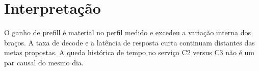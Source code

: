 \section{Interpretação}
O ganho de prefill é material no perfil medido e excedeu a variação interna dos braços. A taxa de decode e a latência de resposta curta continuam distantes das metas propostas. A queda histórica de tempo no serviço C2 versus C3 não é um par causal do mesmo dia.  
